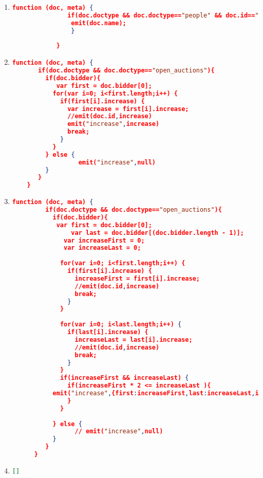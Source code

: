 \label{xmark-queries-couchbase}
\begin{enumerate}[label=Q\arabic*.]
	\item %
	\begin{lstlisting}[language=JSON]
			function (doc, meta) {
			   if(doc.doctype && doc.doctype=="people" && doc.id=="person0"){
				emit(doc.name);	   
			    }
			  
			}
		\end{lstlisting}

	\item %
	\begin{lstlisting}[language=JSON]
	function (doc, meta) {
	   if(doc.doctype && doc.doctype=="open_auctions"){
	     if(doc.bidder){
	     	var first = doc.bidder[0];
	       for(var i=0; i<first.length;i++) {
	         if(first[i].increase) {
	           var increase = first[i].increase;
	           //emit(doc.id,increase)
	           emit("increase",increase)
	           break;
	         }
	       }
	     } else {
	     	      emit("increase",null)
	     }
	   }
	}
	\end{lstlisting}
	
    \item %
	\begin{lstlisting}[language=JSON]
	  function (doc, meta) {
	     if(doc.doctype && doc.doctype=="open_auctions"){
	       if(doc.bidder){
	       	var first = doc.bidder[0];
	         	var last = doc.bidder[(doc.bidder.length - 1)];
	          var increaseFirst = 0;
	          var increaseLast = 0;
	         
	         for(var i=0; i<first.length;i++) {
	           if(first[i].increase) {
	             increaseFirst = first[i].increase;
	             //emit(doc.id,increase)
	             break;
	           }
	         }
	         
	         for(var i=0; i<last.length;i++) {
	           if(last[i].increase) {
	             increaseLast = last[i].increase;
	             //emit(doc.id,increase)
	             break;
	           }
	         }
	         if(increaseFirst && increaseLast) {
	           if(increaseFirst * 2 <= increaseLast ){
	  	   emit("increase",{first:increaseFirst,last:increaseLast,id:doc.id});
	           }
	         }
	         
	       } else {
	       	     // emit("increase",null)
	       }
	     }
	  }
	\end{lstlisting}
	
	
    \item %
	\begin{lstlisting}[language=JSON]
	   []
	\end{lstlisting}
	

\end{enumerate}
